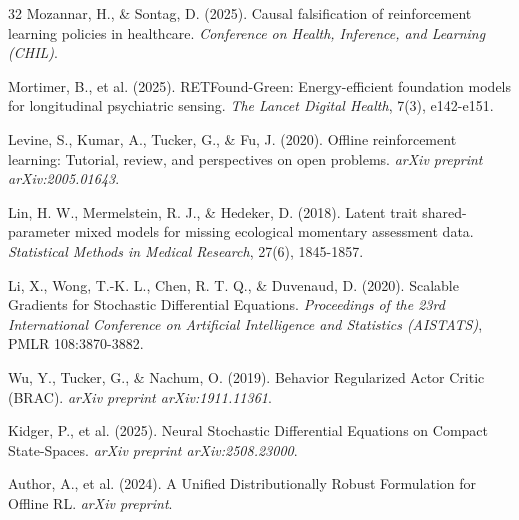 \begin{thebibliography}{32}
Mozannar, H., \& Sontag, D. (2025). Causal falsification of reinforcement learning policies in healthcare. \textit{Conference on Health, Inference, and Learning (CHIL)}.

Mortimer, B., et al. (2025). RETFound-Green: Energy-efficient foundation models for longitudinal psychiatric sensing. \textit{The Lancet Digital Health}, 7(3), e142-e151.

Levine, S., Kumar, A., Tucker, G., \& Fu, J. (2020). Offline reinforcement learning: Tutorial, review, and perspectives on open problems. \textit{arXiv preprint arXiv:2005.01643}.

Lin, H. W., Mermelstein, R. J., \& Hedeker, D. (2018). Latent trait shared-parameter mixed models for missing ecological momentary assessment data. \textit{Statistical Methods in Medical Research}, 27(6), 1845-1857.

Li, X., Wong, T.-K. L., Chen, R. T. Q., \& Duvenaud, D. (2020). Scalable Gradients for Stochastic Differential Equations. \textit{Proceedings of the 23rd International Conference on Artificial Intelligence and Statistics (AISTATS)}, PMLR 108:3870-3882.

Wu, Y., Tucker, G., \& Nachum, O. (2019). Behavior Regularized Actor Critic (BRAC). \textit{arXiv preprint arXiv:1911.11361}.

Kidger, P., et al. (2025). Neural Stochastic Differential Equations on Compact State-Spaces. \textit{arXiv preprint arXiv:2508.23000}.

Author, A., et al. (2024). A Unified Distributionally Robust Formulation for Offline RL. \textit{arXiv preprint}.

\end{thebibliography}
